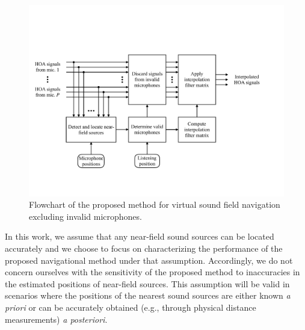 \begin{figure}[t]
    \centering
    \includegraphics[width = \textwidth,trim={0 4cm 3cm 7cm},clip]{08_proposed_method/figures/Interpolation_Flowchart.pdf}
\caption[Flowchart of the proposed parametric interpolation method.]{
Flowchart of the proposed method for virtual sound field navigation excluding invalid microphones.}
\label{fig:08_Proposed_Method:Flowchart}
\end{figure}

In this work, we assume that any near-field sound sources can be located accurately and we choose to focus on characterizing the performance of the proposed navigational method under that assumption.
Accordingly, we do not concern ourselves with the sensitivity of the proposed method to inaccuracies in the estimated positions of near-field sources.
This assumption will be valid in scenarios where the positions of the nearest sound sources are either known \textit{a priori} or can be accurately obtained (e.g., through physical distance measurements) \textit{a posteriori}.
